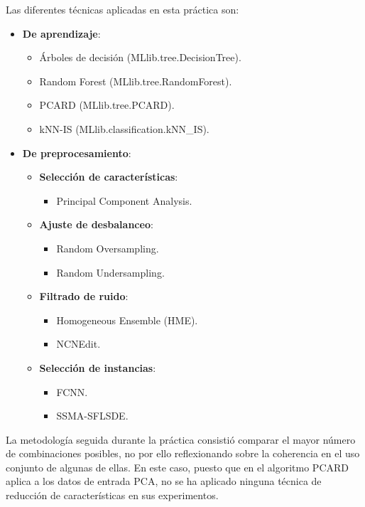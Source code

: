 Las diferentes técnicas aplicadas en esta práctica son:
\begin{itemize}
    \item \textbf{De aprendizaje}: \begin{itemize}
        \item Árboles de decisión (MLlib.tree.DecisionTree).
        \item Random Forest (MLlib.tree.RandomForest).
        \item PCARD (MLlib.tree.PCARD).
        \item kNN-IS (MLlib.classification.kNN\_IS).
    \end{itemize}
    \item \textbf{De preprocesamiento}: \begin{itemize}
        \item \textbf{Selección de características}: \begin{itemize}
            \item Principal Component Analysis.
        \end{itemize}
        \item \textbf{Ajuste de desbalanceo}: \begin{itemize}
            \item Random Oversampling.
            \item Random Undersampling.
        \end{itemize}
        \item \textbf{Filtrado de ruido}: \begin{itemize}
            \item Homogeneous Ensemble (HME).
            \item NCNEdit.
        \end{itemize}
        \item \textbf{Selección de instancias}: \begin{itemize}
            \item FCNN.
            \item SSMA-SFLSDE.
        \end{itemize}
    \end{itemize}
\end{itemize}

La metodología seguida durante la práctica consistió comparar el mayor número de combinaciones posibles, no por ello reflexionando sobre la coherencia en el uso conjunto de algunas de ellas. En este caso, puesto que en el algoritmo PCARD aplica a los datos de entrada PCA, no se ha aplicado ninguna técnica de reducción de características en sus experimentos.

